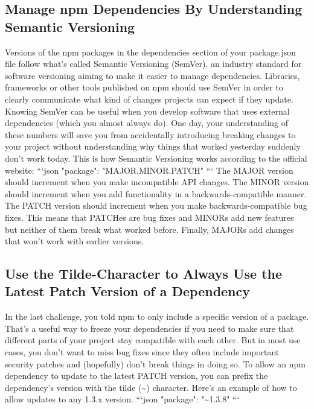 \documentclass{article}%
\begin{document}
\subsection{Manage npm Dependencies By Understanding Semantic Versioning}%
\label{subsec:ManagenpmDependenciesByUnderstandingSemanticVersioning}%
Versions of the npm packages in the dependencies section of your package.json file follow what’s called Semantic Versioning (SemVer), an industry standard for software versioning aiming to make it easier to manage dependencies. Libraries, frameworks or other tools published on npm should use SemVer in order to clearly communicate what kind of changes projects can expect if they update.\newline%
Knowing SemVer can be useful when you develop software that uses external dependencies (which you almost always do). One day, your understanding of these numbers will save you from accidentally introducing breaking changes to your project without understanding why things that worked yesterday suddenly don’t work today. This is how Semantic Versioning works according to the official website:\newline%
```json\newline%
"package": "MAJOR.MINOR.PATCH"\newline%
```\newline%
The MAJOR version should increment when you make incompatible API changes.\newline%
The MINOR version should increment when you add functionality in a backwards{-}compatible manner.\newline%
The PATCH version should increment when you make backwards{-}compatible bug fixes.\newline%
This means that PATCHes are bug fixes and MINORs add new features but neither of them break what worked before. Finally, MAJORs add changes that won’t work with earlier versions.\newline%

%
\subsection{Use the Tilde{-}Character to Always Use the Latest Patch Version of a Dependency}%
\label{subsec:UsetheTilde{-}CharactertoAlwaysUsetheLatestPatchVersionofaDependency}%
In the last challenge, you told npm to only include a specific version of a package. That’s a useful way to freeze your dependencies if you need to make sure that different parts of your project stay compatible with each other. But in most use cases, you don’t want to miss bug fixes since they often include important security patches and (hopefully) don’t break things in doing so.\newline%
To allow an npm dependency to update to the latest PATCH version, you can prefix the dependency’s version with the tilde (\textasciitilde{}) character. Here's an example of how to allow updates to any 1.3.x version.\newline%
```json\newline%
"package": "\textasciitilde{}1.3.8"\newline%
```\newline%
\end{document}
